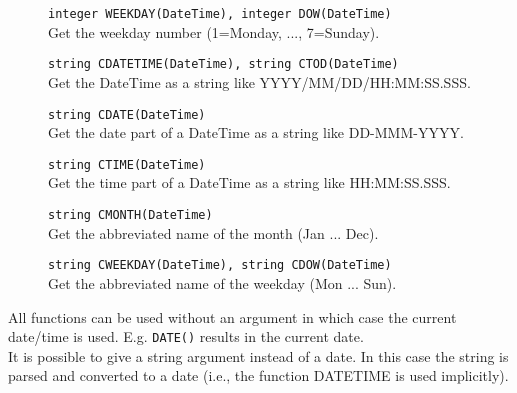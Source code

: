 \begin{description}
  \item[] \texttt{integer WEEKDAY(DateTime),  integer DOW(DateTime)}\\
        Get the weekday number (1=Monday, ..., 7=Sunday).
  \item[] \texttt{string CDATETIME(DateTime),  string CTOD(DateTime)}\\
        Get the DateTime as a string like YYYY/MM/DD/HH:MM:SS.SSS.
  \item[] \texttt{string CDATE(DateTime)}\\
        Get the date part of a DateTime as a string like DD-MMM-YYYY.
  \item[] \texttt{string CTIME(DateTime)}\\
        Get the time part of a DateTime as a string like HH:MM:SS.SSS.
  \item[] \texttt{string CMONTH(DateTime)}\\
        Get the abbreviated name of the month (Jan ... Dec).
  \item[] \texttt{string CWEEKDAY(DateTime),  string CDOW(DateTime)}\\
        Get the abbreviated name of the weekday (Mon ... Sun).
\end{description}
All functions can be used without an argument in which case the current
date/time is used. E.g. \texttt{DATE()} results in the current date.
\\It is possible to give a string argument instead of a date. In this
case the string is parsed and converted to a date (i.e., the
function DATETIME is used implicitly).

